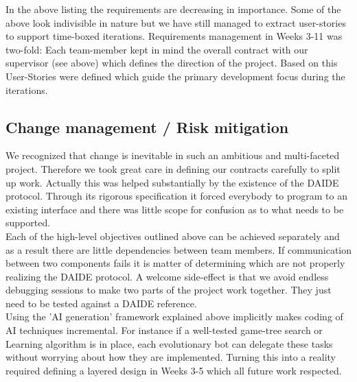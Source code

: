 \documentclass[11pt]{article}
\begin{document}
In the above listing the requirements are decreasing in importance. Some of
the above look indivisible in nature but we have still managed to
extract user-stories to support time-boxed iterations. Requirements management
in Weeks 3-11 was two-fold: Each team-member kept in mind the overall contract
with our supervisor (see above) which defines the direction of the project. 
Based on this User-Stories were defined which guide the primary development
focus during the iterations.

\subsection{Change management / Risk mitigation}
We recognized that change is inevitable in such an ambitious and multi-faceted
project. Therefore we took great care in defining our contracts carefully to
split up work. Actually this was helped substantially by the existence of the
DAIDE protocol. Through its rigorous specification it forced everybody to 
program to an existing interface and there was little scope for confusion as
to what needs to be supported. 
\\
Each of the high-level objectives outlined above can be achieved
separately and as a result there are little dependencies between team members.
If communication between two components fails it is matter of determining
which are not properly realizing the DAIDE protocol. A welcome side-effect
is that we avoid endless debugging sessions to make two parts of the project
work together. They just need to be tested against a DAIDE reference.
\\
Using the 'AI generation' framework explained above implicitly makes coding 
of AI techniques incremental. For instance if a well-tested game-tree search
or Learning algorithm is in place, each evolutionary bot can delegate
these tasks without worrying about how they are implemented. Turning this
into a reality required defining a layered design in Weeks 3-5 which all
future work respected.
\\ 
\end{document}
